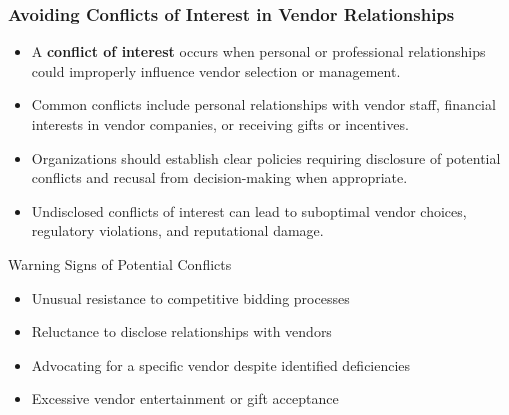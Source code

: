 \documentclass{beamer}
\begin{document}
\begin{frame}
    \frametitle{Avoiding Conflicts of Interest in Vendor Relationships}
    
    \begin{itemize}
        \item A \textbf{conflict of interest} occurs when personal or professional relationships could improperly influence vendor selection or management.
        \item Common conflicts include personal relationships with vendor staff, financial interests in vendor companies, or receiving gifts or incentives.
        \item Organizations should establish clear policies requiring disclosure of potential conflicts and recusal from decision-making when appropriate.
        \item Undisclosed conflicts of interest can lead to suboptimal vendor choices, regulatory violations, and reputational damage.
    \end{itemize}
    
    \begin{alertblock}{Warning Signs of Potential Conflicts}
        \scriptsize
        \begin{itemize}
            \item Unusual resistance to competitive bidding processes
            \item Reluctance to disclose relationships with vendors
            \item Advocating for a specific vendor despite identified deficiencies
            \item Excessive vendor entertainment or gift acceptance
        \end{itemize}
    \end{alertblock}
\end{frame}
\end{document}
